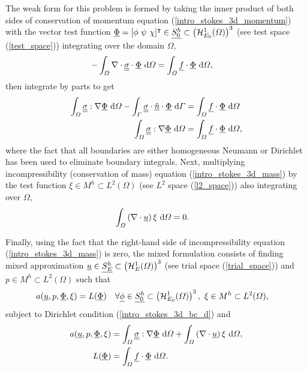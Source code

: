 The weak form for this problem is formed by taking the inner product of both sides of conservation of momentum equation (\ref{intro_stokes_3d_momentum}) with the vector test function $\underline{\Phi} = [\phi\ \psi\ \chi]^\intercal \in \underline{S_0^h} \subset \left( \mathcal{H}_{E_0}^1(\varOmega) \right)^3$ (see test space (\ref{test_space})) integrating over the domain $\Omega$,
\begin{align*}
  -\int_{\varOmega} \nabla \cdot \underline{\underline{\sigma}} \cdot \underline{\Phi} \ \mathrm{d}\varOmega &= \int_{\varOmega} \underline{f} \cdot \underline{\Phi} \ \mathrm{d}\varOmega,
\end{align*}
then integrate by parts to get 
\begin{align*}
  \int_{\varOmega} \underline{\underline{\sigma}} : \nabla \underline{\Phi} \ \mathrm{d}\varOmega - \int_{\varGamma} \underline{\underline{\sigma}} \cdot \underline{\hat{n}} \cdot \underline{\Phi} \ \mathrm{d}\varGamma &= \int_{\varOmega} \underline{f} \cdot \underline{\Phi} \ \mathrm{d}\varOmega \\
  \int_{\varOmega} \underline{\underline{\sigma}} : \nabla \underline{\Phi} \ \mathrm{d}\varOmega &= \int_{\varOmega} \underline{f} \cdot \underline{\Phi} \ \mathrm{d}\varOmega,
\end{align*}
where the fact that all boundaries are either homogeneous Neumann or Dirichlet has been used to eliminate boundary integrals.  Next, multiplying incompressibility (conservation of mass) equation (\ref{intro_stokes_3d_mass}) by the test function $\xi \in M^h \subset L^2(\Omega)$ (see $L^2$ space (\ref{l2_space})) also integrating over $\Omega$,
\begin{align*}
  \int_{\varOmega} \left( \nabla \cdot \underline{u} \right) \xi \ \mathrm{d}\varOmega &= 0.
\end{align*}

Finally, using the fact that the right-hand side of incompressibility equation (\ref{intro_stokes_3d_mass}) is zero, the mixed formulation  consists of finding mixed approximation $\underline{u} \in \underline{S_E^h} \subset \left( \mathcal{H}_E^1(\varOmega) \right)^3$ (see trial space (\ref{trial_space})) and $p \in M^h \subset L^2(\Omega)$ such that
{\footnotesize
\begin{align}
  \label{intro_stokes_3d_mixed_problem}
  a(\underline{u},p,\underline{\Phi},\xi) &= L(\underline{\Phi}) && \forall \underline{\phi} \in \underline{S_0^h} \subset \left( \mathcal{H}_{E_0}^1(\varOmega) \right)^3,\ \xi \in M^h \subset L^2(\varOmega),
\end{align}}
subject to Dirichlet condition (\ref{intro_stokes_3d_bc_d}) and
\begin{align*}
  a(\underline{u},p,\underline{\Phi},\xi) &= \int_{\varOmega} \underline{\underline{\sigma}} : \nabla \underline{\Phi} \ \mathrm{d}\varOmega + \int_{\varOmega} \left( \nabla \cdot \underline{u} \right) \xi \ \mathrm{d}\varOmega, \\
  L(\underline{\Phi}) &= \int_{\varOmega} \underline{f} \cdot \underline{\Phi} \ \mathrm{d}\varOmega.
\end{align*}

